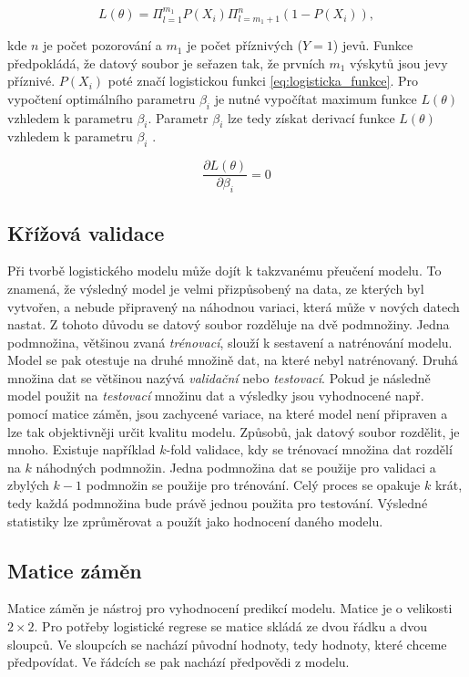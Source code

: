 \begin{equation*}
    \label{eq:pravdepodobnostni_fce}
    L(\theta) = \Pi_{l = 1}^{m_1} P(X_i) \Pi_{l = m_1 + 1}^{n} (1 - P(X_i)),
\end{equation*}

kde $n$ je počet pozorování a $m_1$ je počet příznivých ($Y = 1$) jevů. Funkce předpokládá, že datový soubor je seřazen tak, že prvních $m_1$ výskytů
jsou jevy příznivé. $P(X_i)$ poté značí logistickou funkci \ref{eq:logisticka_funkce}. Pro vypočtení optimálního parametru $\beta_i$ je nutné vypočítat
maximum funkce $L(\theta)$ vzhledem k parametru $\beta_i$. Parametr $\beta_i$ lze tedy získat derivací funkce $L(\theta)$ vzhledem k parametru $\beta_i$
\cite{kleinbaum_logistic_2010}.

\begin{equation*}
    \frac{\partial L(\theta)}{\partial \beta_i} = 0
\end{equation*}

\subsection{Křížová validace}
Při tvorbě logistického modelu může dojít k takzvanému přeučení modelu. To znamená, že výsledný model je velmi přizpůsobený na data, ze kterých byl vytvořen, a nebude
připravený na náhodnou variaci, která může v nových datech nastat. Z tohoto důvodu se datový soubor rozděluje na dvě podmnožiny. Jedna podmnožina, většinou zvaná
\textit{trénovací},
slouží k sestavení a natrénování modelu. Model se pak otestuje
na druhé množině dat, na které nebyl natrénovaný. Druhá množina dat se většinou nazývá \textit{validační} nebo \textit{testovací}. 
Pokud je následně model použit na \textit{testovací} množinu dat a výsledky jsou vyhodnocené např. pomocí matice záměn, jsou zachycené variace,
na které model není připraven a lze tak objektivněji určit kvalitu modelu. Způsobů, jak datový soubor
rozdělit, je mnoho. Existuje například $k$-fold validace, kdy se trénovací množina dat rozdělí na $k$ 
náhodných podmnožin. Jedna podmnožina dat se použije pro validaci a zbylých $k-1$ podmnožin se použije pro trénování.
Celý proces se opakuje $k$ krát, tedy každá podmnožina bude právě jednou použita pro testování. Výsledné statistiky lze zprůměrovat a použít jako hodnocení
daného modelu.

\subsection{Matice záměn}
Matice záměn je nástroj pro vyhodnocení predikcí modelu. Matice je o velikosti $2 \times 2$. Pro potřeby logistické regrese se matice skládá ze dvou řádku a dvou sloupců.
Ve sloupcích se nachází původní hodnoty, tedy hodnoty, které chceme předpovídat. Ve řádcích se pak nachází předpovědi z modelu.  


